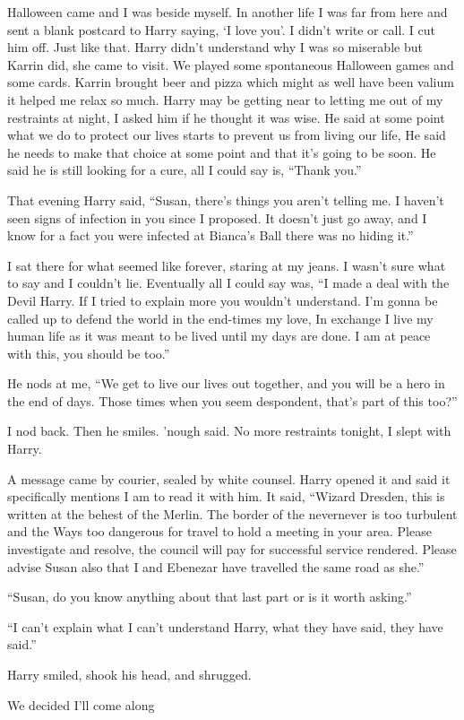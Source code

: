 \parasep

Halloween came and I was beside myself. In another life I was far from here and sent a blank postcard to Harry saying, `I love you'. I didn't write or call. I cut him off. Just like that. Harry didn't understand why I was so miserable but Karrin did, she came to visit. We played some spontaneous Halloween games and some cards. Karrin brought beer and pizza which might as well have been valium it helped me relax so much. Harry may be getting near to letting me out of my restraints at night, I asked him if he thought it was wise. He said at some point what we do to protect our lives starts to prevent us from living our life, He said he needs to make that choice at some point and that it's going to be soon. He said he is still looking for a cure, all I could say is, ``Thank you.''

That evening Harry said, ``Susan, there's things you aren't telling me. I haven't seen signs of infection in you since I proposed. It doesn't just go away, and I know for a fact you were infected at Bianca's Ball there was no hiding it.''

I sat there for what seemed like forever, staring at my jeans. I wasn't sure what to say and I couldn't lie. Eventually all I could say was, ``I made a deal with the Devil Harry. If I tried to explain more you wouldn't understand. I'm gonna be called up to defend the world in the end-times my love, In exchange I live my human life as it was meant to be lived until my days are done. I am at peace with this, you should be too.''

He nods at me, ``We get to live our lives out together, and you will be a hero in the end of days. Those times when you seem despondent, that's part of this too?''

I nod back. Then he smiles. 'nough said. No more restraints tonight, I slept with Harry.

\parasep

A message came by courier, sealed by white counsel. Harry opened it and said it specifically mentions I am to read it with him. It said, ``Wizard Dresden, this is written at the behest of the Merlin. The border of the nevernever is too turbulent and the Ways too dangerous for travel to hold a meeting in your area. Please investigate and resolve, the council will pay for successful service rendered. Please advise Susan also that I and Ebenezar have travelled the same road as she.''

``Susan, do you know anything about that last part or is it worth asking.''

``I can't explain what I can't understand Harry, what they have said, they have said.''

Harry smiled, shook his head, and shrugged.

We decided I'll come along







